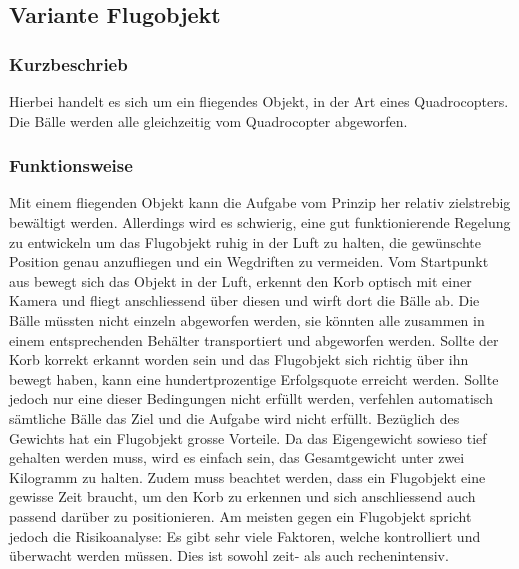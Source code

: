 

\clearpage

\subsection{Variante Flugobjekt}
\subsubsection{Kurzbeschrieb}
Hierbei handelt es sich um ein fliegendes Objekt, in der Art eines Quadrocopters. Die Bälle werden alle gleichzeitig vom Quadrocopter abgeworfen.

\subsubsection{Funktionsweise}
Mit einem fliegenden Objekt kann die Aufgabe vom Prinzip her relativ zielstrebig bewältigt 
werden. Allerdings wird es schwierig, eine gut funktionierende Regelung zu entwickeln um das 
Flugobjekt ruhig in der Luft zu halten, die gewünschte Position genau 
anzufliegen und ein Wegdriften zu vermeiden. 
Vom Startpunkt aus bewegt sich das Objekt in der Luft, erkennt den Korb optisch 
mit einer Kamera und fliegt anschliessend über diesen und wirft dort die Bälle 
ab. Die Bälle müssten nicht einzeln abgeworfen werden, sie könnten alle zusammen 
in einem entsprechenden Behälter transportiert und abgeworfen 
werden. Sollte der Korb korrekt erkannt worden sein und das Flugobjekt sich 
richtig über ihn bewegt haben, kann eine hundertprozentige Erfolgsquote 
erreicht werden. Sollte jedoch nur eine dieser Bedingungen nicht erfüllt werden, verfehlen  
automatisch sämtliche Bälle das Ziel und die Aufgabe wird nicht erfüllt. 
Bezüglich des Gewichts hat ein Flugobjekt grosse Vorteile. Da das Eigengewicht 
sowieso tief gehalten werden muss, wird es einfach sein, das Gesamtgewicht 
unter zwei Kilogramm zu halten.
%
Zudem muss beachtet werden, dass ein Flugobjekt eine gewisse Zeit 
braucht, um den Korb zu erkennen und sich anschliessend auch passend darüber 
zu positionieren. Am meisten gegen ein Flugobjekt spricht jedoch die 
Risikoanalyse: Es gibt sehr viele Faktoren, welche kontrolliert und überwacht 
werden müssen. Dies ist sowohl zeit- als auch rechenintensiv. 

